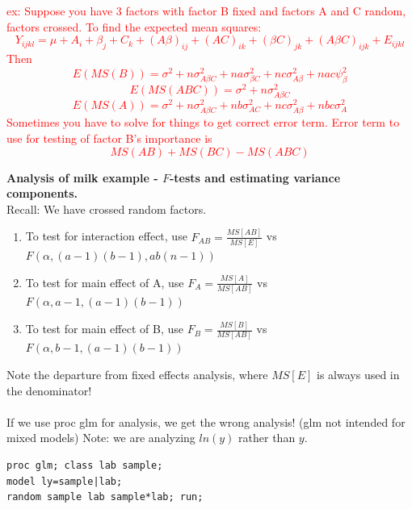 \textcolor{red}{ex: Suppose you have 3 factors with factor B fixed and factors A and C random, factors crossed.  To find the expected mean squares:
$$Y_{ijkl}=\mu+A_i+\beta_j+C_k+(A\beta)_{ij}+(AC)_{ik}+(\beta C)_{jk}+(A\beta C)_{ijk}+E_{ijkl}$$
Then 
$$E(MS(B))= \sigma^2+n\sigma^2_{A\beta C}+na\sigma^2_{\beta C}+nc\sigma^2_{A\beta}+nac\psi^2_{\beta}$$
$$E(MS(ABC))=\sigma^2+n\sigma^2_{A\beta C}$$
$$E(MS(A))= \sigma^2+n\sigma^2_{A\beta C}+nb\sigma^2_{AC}+nc\sigma^2_{A\beta}+nbc\sigma^2_{A}$$
Sometimes you have to solve for things to get correct error term.  Error term to use for testing of factor B's importance is 
$$MS(AB)+MS(BC)-MS(ABC)$$
}

\newpage

\textbf{Analysis of milk example - $F$-tests and estimating variance components.} \\
Recall: We have crossed random factors.  
\begin{enumerate}
\item To test for interaction effect, use $F_{AB}=\frac{MS[AB]}{MS[E]}$ vs $F(\alpha,(a-1)(b-1),ab(n-1))$
\item To test for main effect of A, use $F_{A}=\frac{MS[A]}{MS[AB]}$ vs $F(\alpha,a-1,(a-1)(b-1))$
\item To test for main effect of B, use $F_{B}=\frac{MS[B]}{MS[AB]}$ vs $F(\alpha,b-1,(a-1)(b-1))$
\end{enumerate}
Note the departure from fixed effects analysis, where $MS[E]$ is always used in the denominator!\\~\\

If we use proc glm for analysis, we get the wrong analysis!  (glm not intended for mixed models)  Note: we are analyzing $ln(y)$ rather than $y$.

\begin{small}
\begin{verbatim}
proc glm; class lab sample;
model ly=sample|lab;
random sample lab sample*lab; run;
\end{verbatim}
\end{small}

